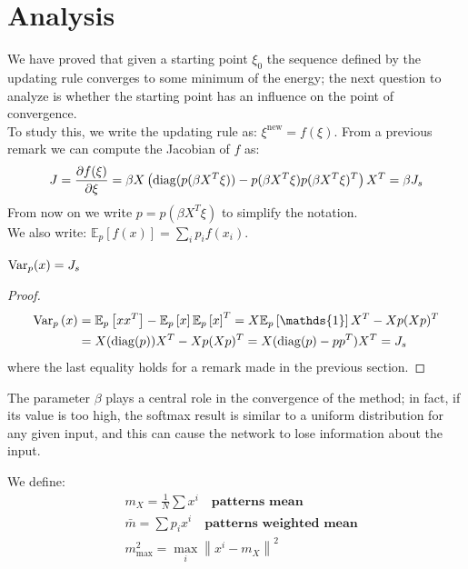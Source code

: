 \section{Analysis}
We have proved that given a starting point $\xi_0$ the sequence defined by the updating rule converges to some minimum of the energy; the next question to analyze is whether the starting point has an influence on the point of convergence.\\
To study this, we write the updating rule as:
$\xi^{\text{new}} = f(\xi)$. From a previous remark we can compute the Jacobian of $f$ as:
\[
J = \frac{\partial f(\xi)}{\partial \xi} = \beta X \left(\operatorname{diag}(p(\beta X^T \xi)) - p(\beta X^T \xi)p(\beta X^T \xi)^T \right)X^T = \beta J_s
\]
From now on we write $p = p(\beta X^T \xi)$ to simplify the notation. \\
We also write: $\mathbb{E}_p\left[f(x)\right] = \sum_i p_i f(x_i)$.
\begin{lemma}
    $\textnormal{Var}_p(x) = J_s$
    \begin{proof}
        \begin{align*}
            \text{Var}_p\left(x\right) &= \mathbb{E}_p\left[xx^T\right] - \mathbb{E}_p\left[x\right] \mathbb{E}_p\left[x\right]^T = X \mathbb{E}_p\left[\mathds{1}\right]X^T - Xp (Xp)^T \\
            &= X(\diagonal(p))X^T -  Xp (Xp)^T =
            X(\diagonal(p) - p p^T) X^T = J_s
        \end{align*}
        where the last equality holds for a remark made in the previous section.
    \end{proof}
\end{lemma}
The parameter $\beta$ plays a central role in the convergence of the method; in fact, if its value is too high, the softmax result is similar to a uniform distribution for any given input, and this can cause the network to lose information about the input.
\begin{definition}
    We define:
    \begin{align*}
        &m_X = \frac1N \sum x^i \quad \textbf{patterns mean} \\
        &\bar{m} = \sum p_i x^i \quad \textbf{patterns weighted mean} \\
        &m^2_{\max} = \max_i \left\|x^i - m_X\right\|^2
    \end{align*}
\end{definition}
